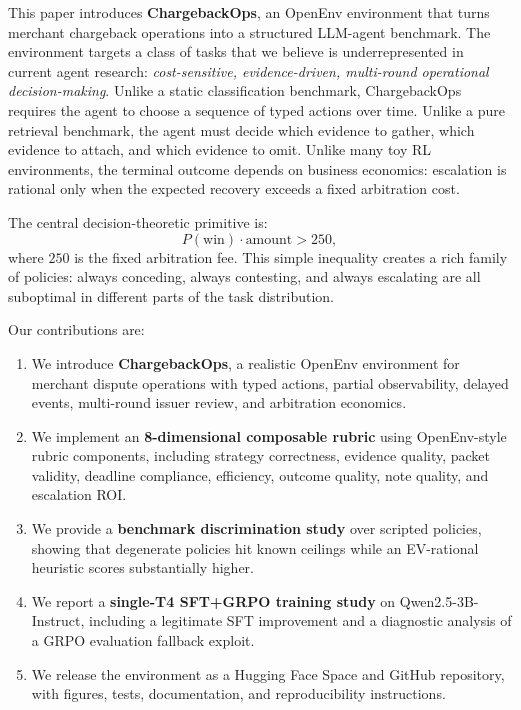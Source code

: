 \documentclass[11pt]{article}
\begin{document}
This paper introduces \textbf{ChargebackOps}, an OpenEnv environment that turns merchant chargeback operations into a structured LLM-agent benchmark. The environment targets a class of tasks that we believe is underrepresented in current agent research: \emph{cost-sensitive, evidence-driven, multi-round operational decision-making}. Unlike a static classification benchmark, ChargebackOps requires the agent to choose a sequence of typed actions over time. Unlike a pure retrieval benchmark, the agent must decide which evidence to gather, which evidence to attach, and which evidence to omit. Unlike many toy RL environments, the terminal outcome depends on business economics: escalation is rational only when the expected recovery exceeds a fixed arbitration cost.

The central decision-theoretic primitive is:
\begin{equation}
    P(\text{win}) \cdot \text{amount} > 250,
\end{equation}
where $250$ is the fixed arbitration fee. This simple inequality creates a rich family of policies: always conceding, always contesting, and always escalating are all suboptimal in different parts of the task distribution.

Our contributions are:
\begin{enumerate}[leftmargin=*]
    \item We introduce \textbf{ChargebackOps}, a realistic OpenEnv environment for merchant dispute operations with typed actions, partial observability, delayed events, multi-round issuer review, and arbitration economics.
    \item We implement an \textbf{8-dimensional composable rubric} using OpenEnv-style rubric components, including strategy correctness, evidence quality, packet validity, deadline compliance, efficiency, outcome quality, note quality, and escalation ROI.
    \item We provide a \textbf{benchmark discrimination study} over scripted policies, showing that degenerate policies hit known ceilings while an EV-rational heuristic scores substantially higher.
    \item We report a \textbf{single-T4 SFT+GRPO training study} on Qwen2.5-3B-Instruct, including a legitimate SFT improvement and a diagnostic analysis of a GRPO evaluation fallback exploit.
    \item We release the environment as a Hugging Face Space and GitHub repository, with figures, tests, documentation, and reproducibility instructions.
\end{enumerate}
\end{document}

